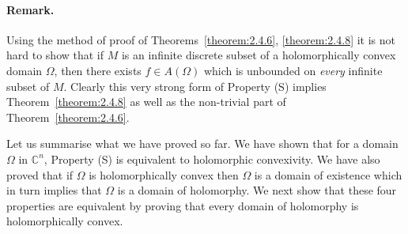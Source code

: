 \paragraph*{Remark.} Using the method of proof of Theorems~\ref{theorem:2.4.6}, \ref{theorem:2.4.8} it is not hard to show that if $M$ is an infinite discrete subset of a holomorphically convex domain $\Omega$, then there exists $f\in A(\Omega)$ which is unbounded on \emph{every} infinite subset of $M$. Clearly this very strong form of Property (S) implies Theorem~\ref{theorem:2.4.8} as well as the non-trivial part of Theorem~\ref{theorem:2.4.6}.

Let us summarise what we have proved so far. We have shown that for a domain $\Omega$ in $\mathbb C^n$, Property (S) is equivalent to holomorphic convexivity. We have also proved that if $\Omega$ is holomorphically convex then $\Omega$ is a domain of existence which in turn implies that $\Omega$ is a domain of holomorphy. We next show that these four properties are equivalent by proving that every domain of holomorphy is holomorphically convex.

